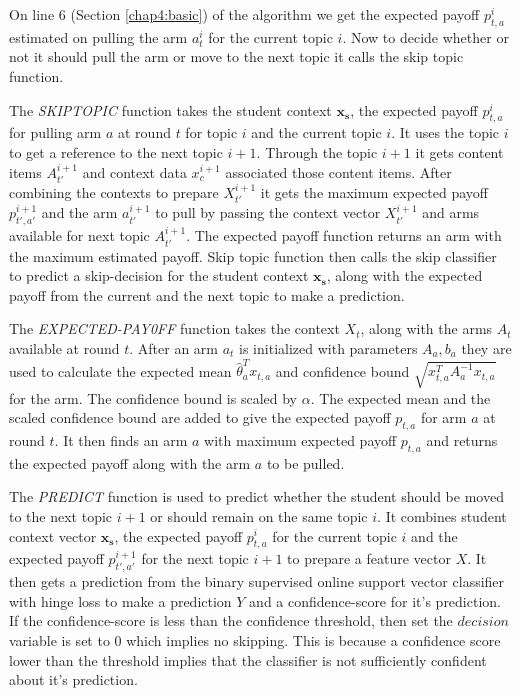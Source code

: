 On line 6 (Section \ref{chap4:basic}) of the algorithm we get the expected payoff $p^{i}_{t,a}$ estimated on pulling the arm $a^{i}_t$ for the current topic $i$. Now to decide whether or not it should pull the arm or move to the next topic it calls the skip topic function. \par

The \textit{SKIPTOPIC} function takes the student context $\mathbf{x_s}$, the expected payoff $p^{i}_{t,a}$ for pulling arm $a$ at round $t$ for topic $i$ and the current topic $i$. It uses the topic $i$ to get a reference to the next topic $i+1$. Through the topic ${i+1}$ it gets content items $A^{i+1}_{t'}$ and context data $x^{i+1}_{c}$ associated those content items. After combining the contexts to prepare $X^{i+1}_{t'}$ 
it gets the maximum expected payoff $p^{i+1}_{t',a'}$ and the arm $a^{i+1}_{t'}$ to pull by passing the context vector $X^{i+1}_{t'}$ and arms available for next topic $A^{i+1}_{t'}$. The expected payoff function returns an arm with the maximum estimated payoff. Skip topic function then calls the skip classifier to predict a skip-decision for the student context $\mathbf{x_s}$, along with the expected payoff from the current and the next topic to make a prediction.

The \textit{EXPECTED-PAY0FF} function takes the context $X_t$, along with the arms $A_t$ available at round $t$. After an arm $a_t$ is initialized with parameters $A_a , b_a$ they are used to calculate the expected mean $\widehat{\theta}^{T}_{a}x_{t,a}$ and confidence bound $\sqrt{x^{T}_{t,a}A^{-1}_{a}x_{t,a}}$ for the arm. The confidence bound is scaled by $\alpha$. The expected mean and the scaled confidence bound are added to give the expected payoff $p_{t,a}$ for arm $a$ at round $t$. It then finds an arm $a$ with maximum expected payoff $p_{t,a}$ and returns the expected payoff along with the arm $a$ to be pulled. \par

The \textit{PREDICT} function is used to predict whether the student should be moved to the next topic $i+1$ or should remain on the same topic $i$. It combines student context vector $\mathbf{x_s}$, the expected payoff $p^{i}_{t,a}$ for the current topic $i$ and the expected payoff $p^{i+1}_{t',a'}$ for the next topic $i+1$ to prepare a feature vector $X$. It then gets a prediction from the binary supervised online support vector classifier with hinge loss to make a prediction $Y$ and a confidence-score for it's prediction. If the confidence-score is less than the confidence threshold, then set the $decision$ variable is set to 0 which implies no skipping. This is because a confidence score lower than the threshold implies that the classifier is not sufficiently confident about it's prediction. \par

